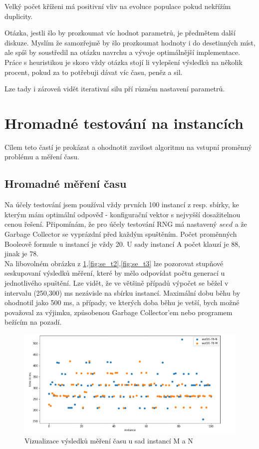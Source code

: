 \documentclass{article}
\begin{document}
Velký počet kříženi má positivní vliv na evoluce populace pokud nekřížím duplicity.

Otázka, jestli šlo by prozkoumat víc hodnot parametrů, je předmětem další diskuze. Myslím že samozřejmě by šlo prozkoumat hodnoty i do desetinných míst, ale spíš by soustředil na otázku navrchu a vývoje optimálnější implementace. Práce s heuristikou je skoro vždy otázka stojí li vylepšení výsledků na několik procent, pokud za to potřebuji dávat víc času, peněz a sil.

Lze tady i zároveň vidět iterativní silu pří různém nastavení parametrů.

\newpage

\section{Hromadné testování na instancích}

Cílem teto častí je prokázat a ohodnotit zavilost algoritmu na vstupní proměnný problému a měření času.

\subsection{Hromadné měření času}

Na účely testování jsem používal vždy prvních 100 instancí z resp. sbírky, ke kterým mám optimální odpověď - konfigurační vektor s nejvyšší dosažitelnou cenou řešení. Připomínám, že pro účely testování RNG má nastavený \(seed\) a že Garbage Collector se vyprázdní před každým spuštěním. Počet proměnných Booleově formule u instancí je vždy 20. U sady instancí A počet klauzí je 88, jinak je 78.\\

Na libovolném obrázku z \ref{fig:se_t1},\ref{fig:se_t2},\ref{fig:se_t3} lze pozorovat stupňové seskupovaní výsledků měření, které by mělo odpovídat počtu generací u jednotlivého spuštění. Lze vidět, že ve většině případů výpočet se běžel v intervalu (250,300) ms nezávisle na sbírku instancí. Maximální dobu běhu by ohodnotil jako 500 ms, a případy, ve kterých doba běhu je vetší, bych možné považoval za výjimku, způsobenou Garbage Collector'em nebo programem bežícím na pozadí.

\begin{figure}[H]
    \centering
    \includegraphics[width=1.2\textwidth]{screenshot_1294}
    \caption{Vizualizace výsledků měření času u sad instancí M a N}
    \label{fig:se_t1}
\end{figure}
\end{document}
